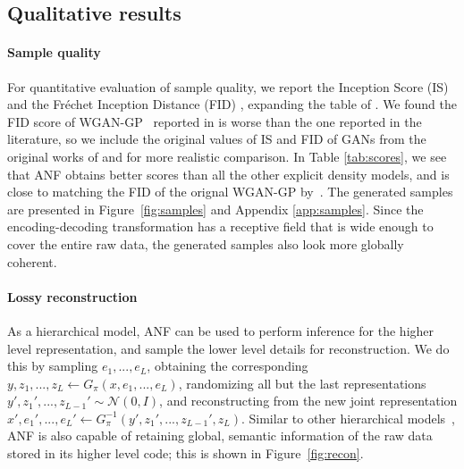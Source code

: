\documentclass{article}
\def\gN{{\mathcal{N}}}
\begin{document}
\subsection{Qualitative results}

\paragraph{Sample quality} For quantitative evaluation of sample quality, we report the Inception Score (IS) \citep{salimans2016improved} and the Fréchet Inception Distance (FID) \citep{heusel2017gans}, expanding the table of \citet{ostrovski2018autoregressive}. 
We found the FID score of WGAN-GP~\citep{gulrajani2017improved} reported in \citet{ostrovski2018autoregressive} is worse than the one reported in the literature, so we include the original values of IS and FID of GANs from the original works of \citet{gulrajani2017improved} and \citet{heusel2017gans} for more realistic comparison.
In Table \ref{tab:scores}, we see that ANF obtains better scores than all the other explicit density models, and is close to matching the FID of the orignal WGAN-GP by~\citet{gulrajani2017improved}. 
The generated samples are presented in Figure~\ref{fig:samples} and Appendix \ref{app:samples}.
Since the encoding-decoding transformation has a receptive field that is wide enough to cover the entire raw data, the generated samples also look more globally coherent. 

\paragraph{Lossy reconstruction}
As a hierarchical model, ANF can be used to perform inference for the higher level representation, and sample the lower level details for reconstruction. 
We do this by sampling $e_1,...,e_L$, obtaining the corresponding $y,z_1,...,z_L \leftarrow G_\pi(x, e_1, ..., e_L)$, randomizing all but the last representations $y', z_1',..., z_{L-1}' \sim \gN(0,I)$, and reconstructing from the new joint representation $x', e_1', ..., e_L' \leftarrow G_\pi^{-1}(y',z_1', ..., z_{L-1}', z_L)$. 
Similar to other hierarchical models~\citep{gulrajani2017pixelvae, belghazi2018hierarchical}, 
ANF is also capable of retaining global, semantic information of the raw data stored in its higher level code; this is shown in Figure~\ref{fig:recon}.
\end{document}
